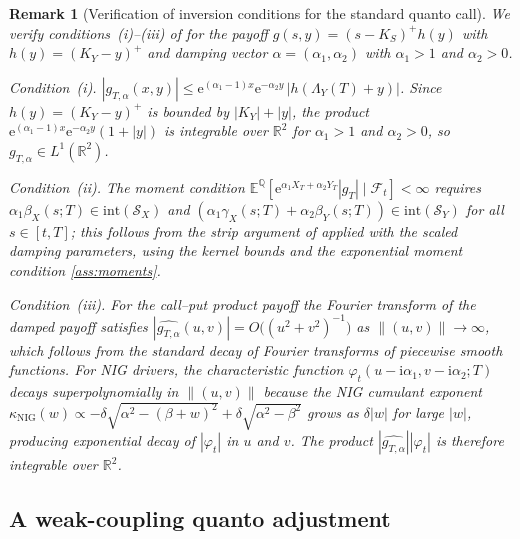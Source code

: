 \documentclass[10pt,a4paper,reqno]{amsart}
\newtheorem{remark}[theorem]{Remark}
\newcommand{\R}{\mathbb{R}}
\newcommand{\E}{\mathbb{E}}
\newcommand{\Q}{\mathbb{Q}}
\newcommand{\F}{\mathcal{F}}
\newcommand{\1}{\mathbbm{1}}
\newcommand{\ii}{\mathrm{i}}
\newcommand{\ee}{\mathrm{e}}
\begin{document}
\begin{remark}[Verification of inversion conditions for the standard quanto call]
\label{rem:fourier_conditions}
We verify conditions~(i)--(iii) of  for the payoff
$g(s,y) = (s-K_S)^+ h(y)$ with $h(y) = (K_Y - y)^+$ and damping vector
$\alpha = (\alpha_1,\alpha_2)$ with $\alpha_1 > 1$ and $\alpha_2 > 0$.

\smallskip
\noindent\textit{Condition~(i).}
$|g_{T,\alpha}(x,y)|
\le \ee^{(\alpha_1-1)x}\ee^{-\alpha_2 y}\,|h(\Lambda_Y(T)+y)|$.
Since $h(y) = (K_Y - y)^+$ is bounded by $|K_Y| + |y|$, the product
$\ee^{(\alpha_1-1)x}\ee^{-\alpha_2 y}(1 + |y|)$ is integrable over $\R^2$ for
$\alpha_1 > 1$ and $\alpha_2 > 0$, so $g_{T,\alpha} \in L^1(\R^2)$.

\smallskip
\noindent\textit{Condition~(ii).}
The moment condition
$\E^\Q[\ee^{\alpha_1 X_T + \alpha_2 Y_T}|g_T|\mid\F_t] < \infty$
requires $\alpha_1\beta_X(s;T) \in \mathrm{int}(\mathcal{S}_X)$ and
$(α_1\gamma_X(s;T) + \alpha_2\beta_Y(s;T)) \in \mathrm{int}(\mathcal{S}_Y)$ for
all $s \in [t,T]$; this follows from the strip argument of
 applied with the scaled damping parameters,
using the kernel bounds and the exponential moment condition
\ref{ass:moments}.

\smallskip
\noindent\textit{Condition~(iii).}
For the call--put product payoff the Fourier transform of the damped payoff
satisfies $|\widehat{g_{T,\alpha}}(u,v)| = O\bigl((u^2+v^2)^{-1}\bigr)$ as
$\|(u,v)\|\to\infty$, which follows from the standard decay of Fourier
transforms of piecewise smooth functions.
For NIG drivers, the characteristic function $\varphi_t(u-\ii\alpha_1,
v-\ii\alpha_2;T)$ decays superpolynomially in $\|(u,v)\|$ because the NIG
cumulant exponent $\kappa_{\mathrm{NIG}}(w) \propto -\delta\sqrt{\alpha^2 -
(\beta + w)^2} + \delta\sqrt{\alpha^2 - \beta^2}$ grows as
$\delta|w|$ for large $|w|$, producing exponential decay of $|\varphi_t|$ in
$u$ and $v$.
The product $|\widehat{g_{T,\alpha}}||\varphi_t|$ is therefore integrable over
$\R^2$.
\end{remark}

\subsection{A weak-coupling quanto adjustment}
\end{document}
